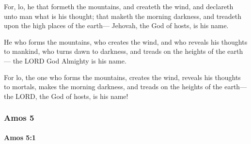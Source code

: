 			\begin{versebox}
					\item[BHS] 
					\item[LXX] 
					\item[ASV] For, lo, he that formeth the mountains, and createth the wind, and declareth unto man what is his thought; that maketh the morning darkness, and treadeth upon the high places of the earth— Jehovah, the God of hosts, is his name.
					\item[NIV] He who forms the mountains, who creates the wind, and who reveals his thoughts to mankind, who turns dawn to darkness, and treads on the heights of the earth— the LORD God Almighty is his name.
					\item[NRSV] For lo, the one who forms the mountains, creates the wind, reveals his thoughts to mortals, makes the morning darkness, and treads on the heights of the earth— the LORD, the God of hosts, is his name!
			\end{versebox}
	\subsubsection{Amos 5} %
		\label{AMOS-5}

		\paragraph{Amos 5:1} %
			\label{AMOS-5-1}

